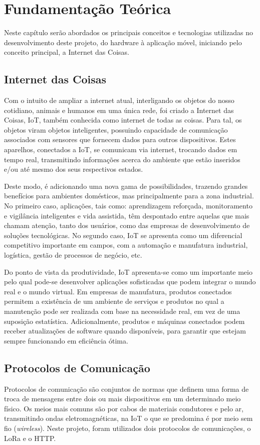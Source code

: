 \chapter{Fundamentação Teórica}
\label{cap:fundamentacao}
Neste capítulo serão abordados os principais conceitos e tecnologias utilizadas no desenvolvimento deste projeto, do hardware à aplicação móvel, iniciando pelo conceito principal, a Internet das Coisas.

\section{Internet das Coisas}
\label{fund:iot}
Com o intuito de ampliar a internet atual, interligando os objetos do nosso cotidiano, animais e humanos em uma única rede, foi criado a Internet das Coisas, IoT, também conhecida como internet de todas as coisas. Para tal, os objetos viram objetos inteligentes, possuindo capacidade de comunicação associados com sensores que fornecem dados para outros dispositivos. Estes aparelhos, conectados a IoT, se comunicam via internet, trocando dados em tempo real, transmitindo informações acerca do ambiente que estão inseridos e/ou até mesmo dos seus respectivos estados. 

Deste modo, é adicionando uma nova gama de possibilidades, trazendo grandes benefícios para ambientes domésticos, mas principalmente para a zona industrial. No primeiro caso, aplicações, tais como: aprendizagem reforçada, monitoramento e vigilância inteligentes e vida assistida, têm despontado entre aquelas que mais chamam atenção, tanto dos usuários, como das empresas de desenvolvimento de soluções tecnológicas. No segundo caso, IoT se apresenta como um diferencial competitivo importante em campos, com a automação e manufatura industrial, logística, gestão de processos de negócio, etc.

Do ponto de vista da produtividade, IoT apresenta-se como um importante meio pelo qual pode-se desenvolver aplicações sofisticadas que podem integrar o mundo real e o mundo virtual. Em empresas de manufatura, produtos conectados permitem a existência de um ambiente de serviços e produtos no qual a manutenção pode ser realizada com base na necessidade real, em vez de uma suposição estatística. Adicionalmente, produtos e máquinas conectados podem receber atualizações de software quando disponíveis, para garantir que estejam sempre funcionando em eficiência ótima.

\section{Protocolos de Comunicação}
\label{fund:protocolos}
Protocolos de comunicação são conjuntos de normas que definem uma forma de troca de mensagens entre dois ou mais dispositivos em um determinado meio físico. Os meios mais comuns são por cabos de materiais condutores e pelo ar, transmitindo ondas eletromagnéticas, na IoT o que se predomina é por meio sem fio (\textit{wireless}). Neste projeto, foram utilizados dois protocolos de comunicações, o LoRa e o HTTP.

